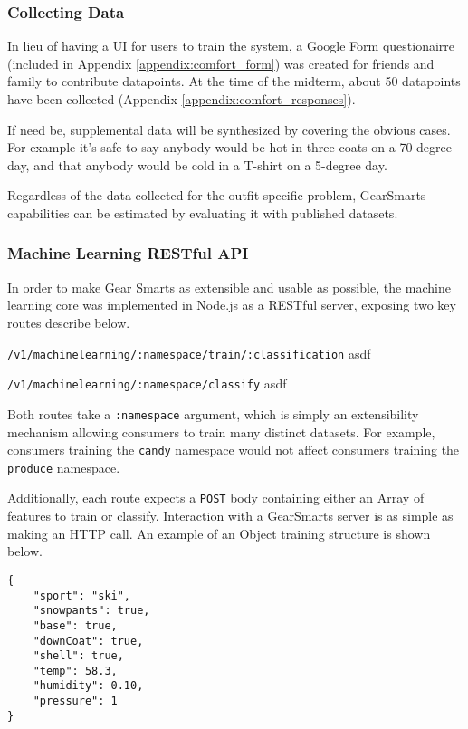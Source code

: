 \subsubsection{Collecting Data}
In lieu of having a UI for users to train the system, a Google Form questionairre (included in Appendix
\ref{appendix:comfort_form}) was created for
friends and family to contribute datapoints. At the time of the midterm, about 50 datapoints have been collected
(Appendix \ref{appendix:comfort_responses}).

If need be, supplemental data will be synthesized by covering the obvious cases. For example it's safe to say anybody
would be hot in three coats on a 70-degree day, and that anybody would be cold in a T-shirt on a 5-degree day.

Regardless of the data collected for the outfit-specific problem, GearSmarts capabilities can be estimated by evaluating
it with published datasets.

\subsubsection{Machine Learning RESTful API}
\label{section:mlapi}
In order to make Gear Smarts as extensible and usable as possible, the machine learning core was implemented in Node.js
as a RESTful server, exposing two key routes describe below.

\begin{description}
    \item{\texttt{/v1/machinelearning/:namespace/train/:classification}} asdf
    \item{\texttt{/v1/machinelearning/:namespace/classify}} asdf
\end{description}

Both routes take a \texttt{:namespace} argument, which is simply an extensibility mechanism allowing consumers to train
many distinct datasets. For example, consumers training the \texttt{candy} namespace would not affect consumers training
the \texttt{produce} namespace.

Additionally, each route expects a \texttt{POST} body containing either an Array of features to
train or classify. Interaction with a GearSmarts server is as simple as making an HTTP call. An example of an Object
training structure is shown below.

\begin{lstlisting}
{
    "sport": "ski",
    "snowpants": true,
    "base": true,
    "downCoat": true,
    "shell": true,
    "temp": 58.3,
    "humidity": 0.10,
    "pressure": 1
}
\end{lstlisting}

